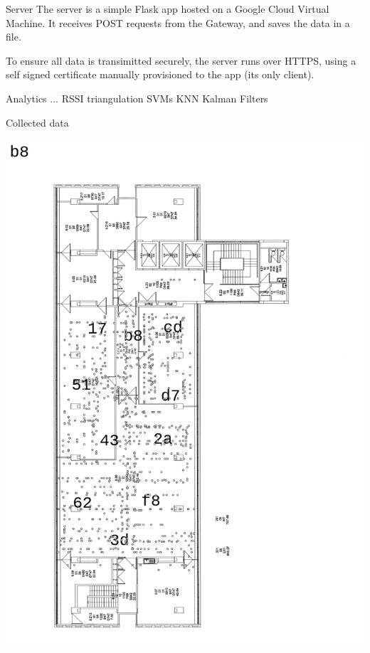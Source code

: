 \documentclass[landscape]{infslides}
\begin{document}
\begin{slide}{Server}
The server is a simple Flask app hosted on a Google Cloud Virtual Machine. It receives POST requests from the Gateway, and saves the data in a file.

To ensure all data is transimitted securely, the server runs over HTTPS, using a self signed certificate manually provisioned to the app (its only client).
\end{slide}
\begin{slide}{Analytics}
    ...
    RSSI triangulation 
    SVMs
    KNN
    Kalman Filters
\end{slide}
\begin{slide}{Collected data}
    \thispagestyle{nofooter}
    
    \begin{multicols}{2}
    \includegraphics[width=0.9\linewidth]{b8_read.png}

\end{multicols}
\end{slide}
\end{document}
